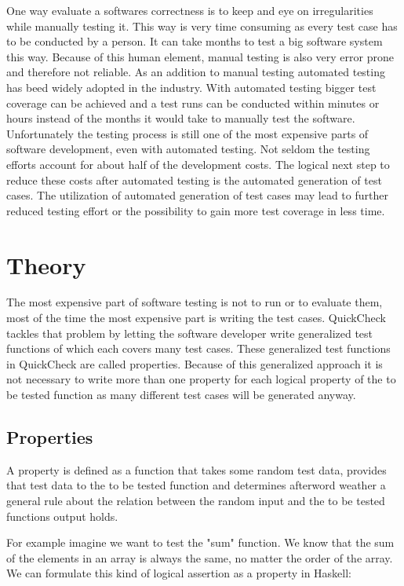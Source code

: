 \documentclass[a4paper, 12pt]{article} %
\begin{document}
One way evaluate a softwares correctness is to keep and eye on irregularities while manually testing it. This way is very time consuming as every test case has to be conducted by a person. It can take months to test a big software system this way. Because of this human element, manual testing is also very error prone and therefore not reliable. As an addition to manual testing automated testing has beed widely adopted in the industry. With automated testing bigger test coverage can be achieved and a test runs can be conducted within minutes or hours instead of the months it would take to manually test the software. Unfortunately the testing process is still one of the most expensive parts of software development, even with automated testing. Not seldom the testing efforts account for about half of the development costs. \cite{Claessen2000} The logical next step to reduce these costs after automated testing is the automated generation of test cases. The utilization of automated generation of test cases may lead to further reduced testing effort or the possibility to gain more test coverage in less time.

\section{Theory}

The most expensive part of software testing is not to run or to evaluate them, most of the time the most expensive part is writing the test cases. QuickCheck tackles that problem by letting the software developer write generalized test functions of which each covers many test cases. These generalized test functions in QuickCheck are called properties. \cite{Hughes2010} Because of this generalized approach it is not necessary to write more than one property for each logical property of the to be tested function as many different test cases will be generated anyway. \cite{Hughes2006}

\subsection{Properties}

A property is defined as a function that takes some random test data, provides that test data to the to be tested function and determines afterword weather a general rule about the relation between the random input and the to be tested functions output holds.

For example imagine we want to test the "sum" function. We know that the sum of the elements in an array is always the same, no matter the order of the array. We can formulate this kind of logical assertion as a property in Haskell:
\end{document}
